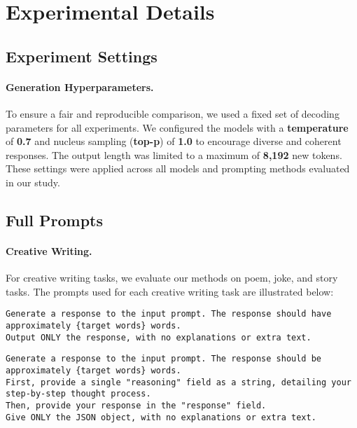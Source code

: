 \section{Experimental Details}

\subsection{Experiment Settings} \label{appendix:experiment_settings}
\paragraph{Generation Hyperparameters.}
To ensure a fair and reproducible comparison, we used a fixed set of decoding parameters for all experiments. We configured the models with a \textbf{temperature} of \textbf{0.7} and nucleus sampling (\textbf{top-p}) of \textbf{1.0} to encourage diverse and coherent responses. The output length was limited to a maximum of \textbf{8,192} new tokens. These settings were applied across all models and prompting methods evaluated in our study.



\subsection{Full Prompts}\label{appendix:experiment_prompt}

\paragraph{Creative Writing.}
For creative writing tasks, we evaluate our methods on poem, joke, and story tasks. The prompts used for each creative writing task are illustrated below:

\begin{tcolorbox}[colback=gray!5!white, colframe=gray!75!black, title=Direct Prompt:]
\small
\texttt{Generate a response to the input prompt. The response should have approximately \{target words\} words.}\\
\texttt{Output ONLY the response, with no explanations or extra text.}
\end{tcolorbox}

\begin{tcolorbox}[colback=gray!5!white, colframe=gray!75!black, title=Direct Prompting with CoT:]
\small
\texttt{Generate a response to the input prompt. The response should be approximately \{target words\} words.} \\

\texttt{First, provide a single "reasoning" field as a string, detailing your step-by-step thought process.} \\
\texttt{Then, provide your response in the "response" field.} \\

\texttt{Give ONLY the JSON object, with no explanations or extra text.}
\end{tcolorbox}

